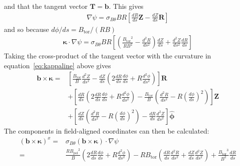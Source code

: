 \documentclass[12pt]{article}
\newcommand{\sbt}{\ensuremath{\sigma_{B\theta}}}
\newcommand{\dd}[2]{\ensuremath{\frac{d #1}{d #2}}}
\newcommand{\ddd}[2]{\ensuremath{\frac{d^2 #1}{d #2^2}}}
\newcommand{\Bp}{\ensuremath{B_{\text{pol}}}}
\newcommand{\Bt}{\ensuremath{B_{\text{tor}}}}
\newcommand{\ve}[1]{\ensuremath{\boldsymbol{#1}}}
\newcommand{\hv}[1]{\hat{\ve{#1}}}
\newcommand{\bvec}{\ve{b}}
\newcommand{\kvec}{\ve{\kappa}}
\newcommand{\phivec}{\ensuremath{\hv{\phi}}}
\begin{document}
%
and that the tangent vector $\ve{T} = \bvec$. This gives
%
\begin{align}
\nabla\psi = \sbt BR\left[\frac{dR}{ds}\ve{Z} - \frac{dZ}{ds}\ve{R}\right]
\label{eq:flinegradpsi}
\end{align}
%
and so because $d\phi / ds = \Bt / \left(RB\right)$
%
\begin{align}
\kvec\cdot\nabla\psi = \sbt BR\left[ \left( \frac{\Bt^2}{RB^2} -
\ddd{R}{s}\right)\dd{Z}{s} + \ddd{Z}{s}\frac{dR}{ds} \right]
\label{eq:flinekappsi}
\end{align}
%
Taking the cross-product of the tangent vector with the curvature in
equation~\ref{eq:kappaline} above gives
%
\begin{align*}
  \bvec \times\kvec =& \left[\frac{\Bt}{B}\ddd{Z}{s} -
\dd{Z}{s}\left(2\dd{R}{s}\dd{\phi}{s} + R\ddd{\phi}{s}\right)\right]\ve{R} \\
&+ \left[\dd{R}{s}\left(2\dd{R}{s}\dd{\phi}{s} + R\ddd{\phi}{s}\right) -
\frac{\Bt}{B}\left(\ddd{R}{s} -
R\left(\dd{\phi}{s}\right)^2\right)\right]\ve{Z} \\ &+
    \left[\dd{Z}{s}\left(\ddd{R}{s} - R\left(\dd{\phi}{s}\right)^2\right) -
    \dd{R}{s}\ddd{Z}{s}\right]\phivec
\end{align*}
%
The components in field-aligned coordinates can then be calculated:
%
\begin{align*}
\left(\bvec\times\kvec\right)^x =&
    \sbt\left(\bvec\times\kvec\right)\cdot\nabla\psi \\ =&
    \frac{R\Bp^2}{B}\left(2\dd{R}{s}\dd{\phi}{s} + R\ddd{\phi}{s}\right) -
    R\Bt\left(\dd{R}{s}\ddd{R}{s} + \dd{Z}{s}\ddd{Z}{s}\right) +
    \frac{\Bt^3}{B^2}\dd{R}{s}
\end{align*}
%
\end{document}

